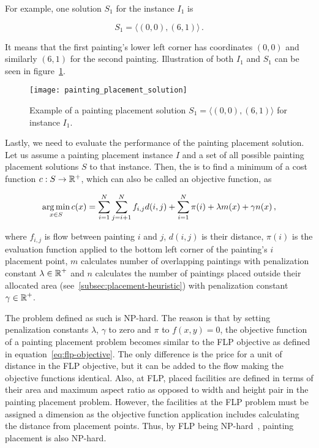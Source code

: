 For example, one solution $S_1$ for the instance $I_1$ is

\[
    S_1 = \langle (0,0), (6,1) \rangle \,.
\]

It means that the first painting's lower left corner has coordinates $(0,0)$
and similarly $(6,1)$ for the second painting.
Illustration of both $I_1$ and $S_1$ can be seen in figure~\ref{fig:painting-placement-solution}.

\begin{figure}
    \texttt{[image: painting\_placement\_solution]}
    \caption[Example of a painting placement solution]{Example of a painting placement solution $S_1 = \langle (0,0), (6,1) \rangle$ for instance $I_1$.}
    \label{fig:painting-placement-solution}
\end{figure}

\newpage

Lastly, we need to evaluate the performance of the painting placement solution.
Let us assume a painting placement instance $I$ and a set of all possible painting placement solutions $S$ to that instance.
Then, the  is to find a minimum of a cost function $c: S \to \operatorname*{\mathbb{R}^+}$,
which can also be called an objective function, as


\begin{equation}
    \operatorname*{arg\,min}_{x \in S} c(x) = \sum\limits_{i=1}^N\sum\limits_{j=i+1}^N f_{i,j}d(i, j) + \sum\limits_{i=1}^N \pi(i) + \lambda m(x) + \gamma n(x) \,,
    \label{eq:objective}
\end{equation}

where $f_{i,j}$ is flow between painting $i$ and $j$, $d(i,j)$ is their distance,
$\pi(i)$ is the evaluation function applied to the bottom left corner of the painting's $i$  placement point,
$m$ calculates number of overlapping paintings with penalization constant $\lambda \in \operatorname*{\mathbb{R}}^+$
and $n$ calculates the number of paintings placed outside their allocated area (see~\ref{subsec:placement-heuristic})
with penalization constant $\gamma \in \operatorname*{\mathbb{R}}^+$.

The problem defined as such is NP-hard.
The reason is that by setting penalization constants $\lambda$, $\gamma$ to zero and $\pi$ to $f(x,y) = 0$,
the objective function of a painting placement problem becomes similar to the FLP objective as defined in equation~\ref{eq:flp-objective}.
The only difference is the price for a unit of distance in the FLP objective, but it can be added to the flow making the objective functions identical.
Also, at FLP, placed facilities are defined in terms of their area and maximum aspect ratio as opposed to width and height pair in the painting placement problem.
However, the facilities at the FLP problem must be assigned a dimension as the objective function application includes calculating the distance from placement points.
Thus, by FLP being NP-hard~\cite{liuMultiobjectiveParticleSwarm2018, goncalvesBiasedRandomkeyGenetic2015, friedrichIntegratedSlicingTree2018}, painting placement is also NP-hard.
